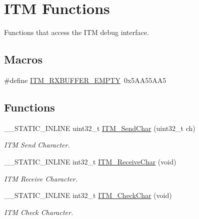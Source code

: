 \hypertarget{group___c_m_s_i_s__core___debug_functions}{}\section{I\+TM Functions}
\label{group___c_m_s_i_s__core___debug_functions}


Functions that access the I\+TM debug interface.  


\subsection*{Macros}
\begin{DoxyCompactItemize}
\item 
\#define \hyperlink{group___c_m_s_i_s__core___debug_functions_gaa822cb398ee022b59e9e6c5d7bbb228a}{I\+T\+M\+\_\+\+R\+X\+B\+U\+F\+F\+E\+R\+\_\+\+E\+M\+P\+TY}~0x5\+A\+A55\+A\+A5
\end{DoxyCompactItemize}
\subsection*{Functions}
\begin{DoxyCompactItemize}
\item 
\+\_\+\+\_\+\+S\+T\+A\+T\+I\+C\+\_\+\+I\+N\+L\+I\+NE uint32\+\_\+t \hyperlink{group___c_m_s_i_s__core___debug_functions_gac90a497bd64286b84552c2c553d3419e}{I\+T\+M\+\_\+\+Send\+Char} (uint32\+\_\+t ch)
\begin{DoxyCompactList}\small\item\em I\+TM Send Character. \end{DoxyCompactList}\item 
\+\_\+\+\_\+\+S\+T\+A\+T\+I\+C\+\_\+\+I\+N\+L\+I\+NE int32\+\_\+t \hyperlink{group___c_m_s_i_s__core___debug_functions_gac3ee2c30a1ac4ed34c8a866a17decd53}{I\+T\+M\+\_\+\+Receive\+Char} (void)
\begin{DoxyCompactList}\small\item\em I\+TM Receive Character. \end{DoxyCompactList}\item 
\+\_\+\+\_\+\+S\+T\+A\+T\+I\+C\+\_\+\+I\+N\+L\+I\+NE int32\+\_\+t \hyperlink{group___c_m_s_i_s__core___debug_functions_gae61ce9ca5917735325cd93b0fb21dd29}{I\+T\+M\+\_\+\+Check\+Char} (void)
\begin{DoxyCompactList}\small\item\em I\+TM Check Character. \end{DoxyCompactList}\end{DoxyCompactItemize}
